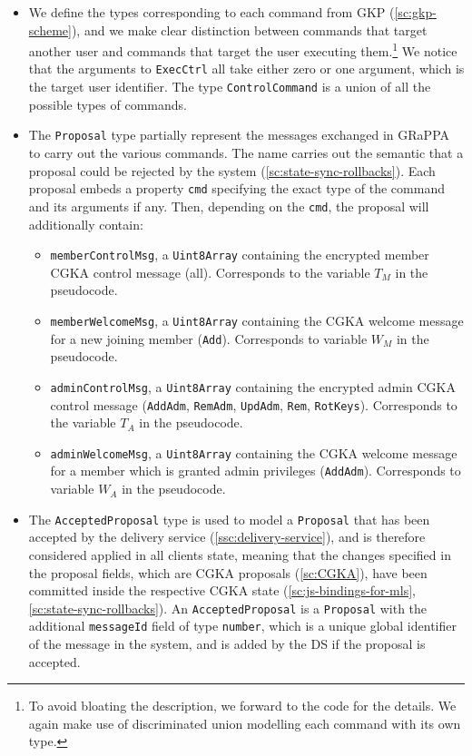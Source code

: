 \begin{itemize}
    \item We define the types corresponding to each command from GKP (\cref{sc:gkp-scheme}),
    and we make clear distinction between commands that target another user and commands that
    target the user executing them.\footnote{To avoid bloating the description, we forward to the code for the details. We again make use of discriminated union modelling each command with its own type.} 
    We notice that the arguments to \texttt{ExecCtrl} all take
    either zero or one argument, which is the target user identifier.
    The type \texttt{ControlCommand} is a union of all the possible types of commands.

    \item The \texttt{Proposal} type partially represent the messages exchanged in GRaPPA 
    to carry out the various commands. The name carries out the semantic
    that a proposal could be rejected by the system (\cref{sc:state-sync-rollbacks}).
    Each proposal embeds a property \texttt{cmd}
    specifying the exact type of the command and its arguments if any.
    Then, depending on the \texttt{cmd}, the proposal will additionally contain:
    \begin{itemize}
        \item \texttt{memberControlMsg}, a \texttt{Uint8Array} containing the encrypted member CGKA control message (all). Corresponds to the variable $T_M$ in the pseudocode.
        \item \texttt{memberWelcomeMsg}, a \texttt{Uint8Array} containing the CGKA welcome message for a new joining member (\texttt{Add}). Corresponds to variable $W_M$ in the pseudocode.
        \item \texttt{adminControlMsg}, a \texttt{Uint8Array} containing the encrypted admin CGKA control message (\texttt{AddAdm}, \texttt{RemAdm}, \texttt{UpdAdm}, \texttt{Rem}, \texttt{RotKeys}). Corresponds to the variable $T_A$ in the pseudocode.
        \item \texttt{adminWelcomeMsg}, a \texttt{Uint8Array} containing the CGKA welcome message for a member which is granted admin privileges (\texttt{AddAdm}). Corresponds to variable $W_A$ in the pseudocode.
    \end{itemize}

    \item The \texttt{AcceptedProposal} type is used to model a \texttt{Proposal}
    that has been accepted by the delivery service (\cref{ssc:delivery-service}),
    and is therefore considered applied in all clients state, meaning that
    the changes specified in the proposal fields, which are CGKA proposals (\cref{sc:CGKA}),
    have been committed inside the respective CGKA state (\cref{sc:js-bindings-for-mls}, \cref{sc:state-sync-rollbacks}).
    An \texttt{AcceptedProposal} is a \texttt{Proposal} with the additional \texttt{messageId} field of type \texttt{number},
    which is a unique global identifier of the message in the system, and is added by the DS if the proposal is accepted.


\end{itemize}
